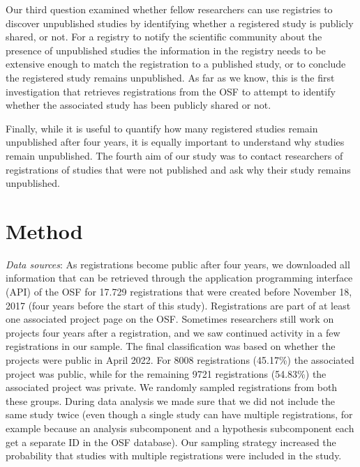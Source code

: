 \documentclass[
  ,jou, a4paper,floatsintext]{apa6}
\begin{document}
Our third question examined whether fellow researchers can use registries to discover unpublished studies by identifying whether a registered study is publicly shared, or not. For a registry to notify the scientific community about the presence of unpublished studies the information in the registry needs to be extensive enough to match the registration to a published study, or to conclude the registered study remains unpublished. As far as we know, this is the first investigation that retrieves registrations from the OSF to attempt to identify whether the associated study has been publicly shared or not.

Finally, while it is useful to quantify how many registered studies remain unpublished after four years, it is equally important to understand why studies remain unpublished. The fourth aim of our study was to contact researchers of registrations of studies that were not published and ask why their study remains unpublished.

\hypertarget{method}{%
\section{Method}\label{method}}

\emph{Data sources}: As registrations become public after four years, we downloaded all information that can be retrieved through the application programming interface (API) of the OSF for 17.729 registrations that were created before November 18, 2017 (four years before the start of this study). Registrations are part of at least one associated project page on the OSF. Sometimes researchers still work on projects four years after a registration, and we saw continued activity in a few registrations in our sample. The final classification was based on whether the projects were public in April 2022. For 8008 registrations (45.17\%) the associated project was public, while for the remaining 9721 registrations (54.83\%) the associated project was private. We randomly sampled registrations from both these groups. During data analysis we made sure that we did not include the same study twice (even though a single study can have multiple registrations, for example because an analysis subcomponent and a hypothesis subcomponent each get a separate ID in the OSF database). Our sampling strategy increased the probability that studies with multiple registrations were included in the study.
\end{document}
